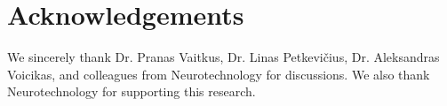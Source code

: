 \documentclass{article}
\begin{document}

\section{Acknowledgements}

We sincerely thank Dr. Pranas Vaitkus, Dr. Linas Petkevi\v{c}ius, Dr. Aleksandras Voicikas, and colleagues from Neurotechnology for discussions. We also thank Neurotechnology for supporting this research.
\end{document}
